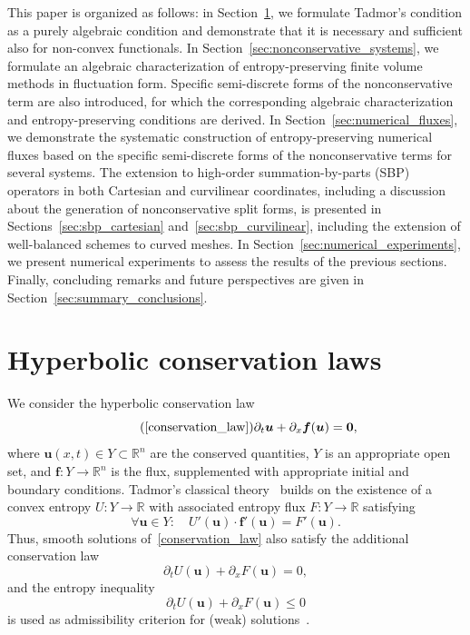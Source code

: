 \documentclass[]{scrartcl}
\renewcommand{\vec}[1]{\boldsymbol{#1}}
\theoremstyle{definition}
\begin{document}
This paper is organized as follows: in Section~\ref{sec:conservation_laws}, we formulate Tadmor's condition as a purely algebraic condition and demonstrate that it is necessary and sufficient also for non-convex functionals.
In Section~\ref{sec:nonconservative_systems}, we formulate an algebraic characterization of entropy-preserving finite volume methods in fluctuation form. Specific semi-discrete forms of the nonconservative term are also introduced, for which the corresponding algebraic characterization and entropy-preserving conditions are derived.
In Section~\ref{sec:numerical_fluxes}, we demonstrate the systematic construction of entropy-preserving numerical fluxes based on the specific semi-discrete forms of the nonconservative terms for several systems.
The extension to high-order summation-by-parts (SBP) operators in both Cartesian and curvilinear coordinates, including a discussion about the generation of nonconservative split forms, is presented in Sections~\ref{sec:sbp_cartesian} and~\ref{sec:sbp_curvilinear}, including the extension of well-balanced schemes to curved meshes.
In Section~\ref{sec:numerical_experiments}, we present numerical experiments to assess the results of the previous sections.
Finally, concluding remarks and future perspectives are given in Section~\ref{sec:summary_conclusions}.
\section{Hyperbolic conservation laws}
\label{sec:conservation_laws}
We consider the hyperbolic conservation law
\begin{equation}
\tag{\ref{conservation_law}}
	\partial_t \vec{u} + \partial_x \vec{f}(\vec{u}) = \vec{0},
\end{equation}
where $\vec{u}(x,t) \in Y \subset \mathbb{R}^n$ are the conserved quantities, $Y$ is an appropriate open set, and $\vec{f}\colon Y \to \mathbb{R}^n$ is the flux, supplemented with appropriate initial and boundary conditions.
Tadmor's classical theory~\cite{Tadmor1987,Tadmor2003} builds on the existence of a convex entropy $U\colon Y \to \mathbb{R}$ with associated entropy flux $F\colon Y \to \mathbb{R}$ satisfying
\begin{equation}\label{chain_rule_ec}
    \forall \vec{u} \in Y\colon \quad U'(\vec{u}) \cdot \vec{f}'(\vec{u}) = F'(\vec{u}).
\end{equation}
Thus, smooth solutions of~\eqref{conservation_law} also satisfy the additional conservation law
\begin{equation}
    \partial_t U(\vec{u}) + \partial_x F(\vec{u}) = 0,
    \label{entropy_equality}
\end{equation}
and the entropy inequality
\begin{equation}
    \partial_t U(\vec{u}) + \partial_x F(\vec{u}) \leq 0
    \label{entropy_inequality}
\end{equation}
is used as admissibility criterion for (weak) solutions~\cite{dafermos2016hyperbolic}.
\end{document}
